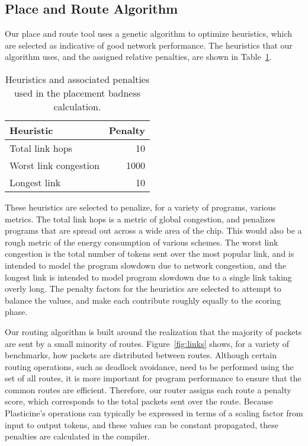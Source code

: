 \subsection{Place and Route Algorithm}
Our place and route tool uses a genetic algorithm to optimize heuristics, which are selected as indicative of good network performance. 
The heuristics that our algorithm uses, and the assigned relative penalties, are shown in Table~\ref{heuristics}.
\begin{table}
  \centering
    \begin{tabular}{l|r}
Heuristic & Penalty \\\hline
Total link hops & 10 \\
Worst link congestion & 1000 \\
Longest link & 10
    \end{tabular}
  \caption{Heuristics and associated penalties used in the placement badness calculation.}
  \label{heuristics}
\end{table}
These heuristics are selected to penalize, for a variety of programs, various metrics. The total link hops is a metric of global congestion, and penalizes programs that are spread out across a wide area of the chip. This would also be a rough metric of the energy consumption of various schemes. The worst link congestion is the total number of tokens sent over the most popular link, and is intended to model the program slowdown due to network congestion, and the longest link is intended to model program slowdown due to a single link taking overly long. The penalty factors for the heuristics are selected to attempt to balance the values, and make each contribute roughly equally to the scoring phase.

Our routing algorithm is built around the realization that the majority of packets are sent by a small minority of routes. 
Figure~\ref{fig:links} shows, for a variety of benchmarks, how packets are distributed between routes.
Although certain routing operations, such as deadlock avoidance, need to be performed using the set of all routes, it is more important for program performance to ensure that the common routes are efficient.
Therefore, our router assigns each route a penalty score, which corresponds to the total packets sent over the route.
Because Plasticine's operations can typically be expressed in terms of a scaling factor from input to output tokens, and these values can be constant propagated, these penalties are calculated in the compiler.

